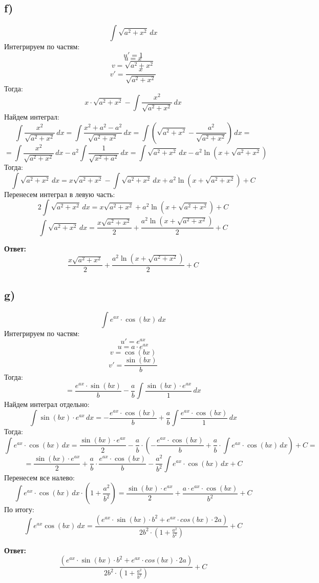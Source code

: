 \documentclass[a4paper,12pt]{article}
\begin{document}
\subsection*{f)}
\[
\int \sqrt{a^2 + x^2} \, dx
\]
Интегрируем по частям:
\[
u' = 1
\]
\[
u = x
\]
\[
v = \sqrt{a^2+x^2}
\]
\[
v' = \frac{x}{\sqrt{a^2 + x^2}}
\]
Тогда:
\[
x \cdot \sqrt{a^2 + x^2} - \int \frac{x^2}{\sqrt{a^2+x^2}} \, dx
\]
Найдем интеграл:
\[
\int \frac{x^2}{\sqrt{a^2 + x^2}} \, dx = \int \frac{x^2 + a^2 - a^2}{\sqrt{a^2 + x^2}} \, dx = \int \left(\sqrt{a^2 + x^2} - \frac{a^2}{\sqrt{a^2+x^2}}\right) \, dx = 
\]
\[
=
\int \frac{x^2}{\sqrt{a^2+x^2}}\, dx - a^2 \int \frac{1}{\sqrt{x^2 + a^2}} \, dx = \int \sqrt{a^2 + x^2} \, dx - a^2 \ln (x + \sqrt{a^2 + x^2})
\]
Тогда:
\[
\int \sqrt{a^2 + x^2} \, dx = x\sqrt{a^2+ x^2} - \int \sqrt{a^2 + x^2} \, dx + a^2 \ln \left( x + \sqrt{a^2 + x^2} \right) + C
\]
Перенесем интеграл в левую часть:
\[
2 \int \sqrt{a^2 + x^2} \, dx = x \sqrt{a^2 + x^2} + a^2 \ln \left(x + \sqrt{a^2 + x^2}\right) + C
\]
\[
\int \sqrt{a^2 + x^2} \, dx = \frac{x \sqrt{a^2 + x^2}}{2}  + \frac{a^2 \ln \left(x + \sqrt{a^2 + x^2}\right)}{2}  + C
\]
{\Large \begin{center}
\textbf{Ответ: } 
\[
\frac{x \sqrt{a^2 + x^2}}{2}  + \frac{a^2 \ln \left(x + \sqrt{a^2 + x^2}\right)}{2} + C
\]
\end{center}}
\subsection*{g)}
\[
\int e^{ax} \cdot \cos (bx) \, dx 
\]
Интегрируем по частям:
\[
u' = e^{ax}
\]
\[
u = a \cdot e^{ax}
\]
\[
v = \cos(bx)
\]
\[
v' = \frac{\sin(bx)}{b}
\]
Тогда:
\[
= \frac{ e^{ax} \cdot \sin (bx)}{b} - \frac{a}{b} \int \frac{\sin (bx) \cdot e^{ax}}{1} \, dx
\]
Найдем интеграл отдельно:
\[
\int \sin (bx) \cdot e^{ax} \, dx =- \frac{e^{ax} \cdot \cos (bx)}{b} + \frac{a}{b} \int \frac{ e^{ax} \cdot \cos (bx) }{1} \, dx
\]
Тогда:
\[
\int e^{ax} \cdot \cos(bx)  \, dx  = \frac{\sin(bx) \cdot e^{ax}}{2} - \frac{a}{b} \cdot \left( - \frac{e^{ax} \cdot \cos(bx)}{b} + \frac{a}{b} \cdot \int e^{ax} \cdot \cos (bx) \, dx\right) + C = 
\]
\[
 = \frac{\sin (bx) \cdot e^{ax}}{2} + \frac{a}{b} \cdot \frac{e^{ax} \cdot \cos (bx)}{b} - \frac{a^2}{b^2} \int e^{ax} \cdot \cos (bx)\, dx + C
\]
Перенесем все налево:
\[
\int e^{ax} \cdot \cos (bx) \, dx \cdot \left(1 + \frac{a^2}{b^2} \right) = \frac{\sin (bx) \cdot e^{ax}}{2}  + \frac{a \cdot e^{ax} \cdot \cos (bx)}{b^2} + C
\]
По итогу:
\[
\int e^{ax} \cos (bx) \, dx  = \frac{\left(e^{ax} \cdot \sin(bx) \cdot b^2 + e^{ax} \cdot cos(bx) \cdot 2a \right)}{2b^2 \cdot \left(1 + \frac{a^2}{b^2}\right)} + C
\]
{\Large \begin{center}
\textbf{Ответ: } 
\[
\frac{\left(e^{ax} \cdot \sin(bx) \cdot b^2 + e^{ax} \cdot cos(bx) \cdot 2a \right)}{2b^2 \cdot \left(1 + \frac{a^2}{b^2}\right)} + C
\]
\end{center}}
\end{document}
